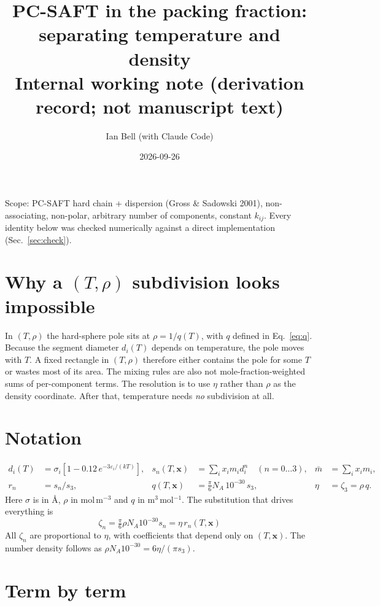 \documentclass[11pt]{article}
\author{Ian Bell (with Claude Code)}
\title{PC-SAFT in the packing fraction: separating temperature and density\\
\large Internal working note (derivation record; not manuscript text)}
\date{2026-09-26}
\newcommand{\mbar}{\bar m}
\begin{document}
\maketitle

\noindent Scope: PC-SAFT hard chain + dispersion (Gross \& Sadowski 2001), non-associating,
non-polar, arbitrary number of components, constant $k_{ij}$. Every identity below was checked
numerically against a direct implementation (Sec.~\ref{sec:check}).

\section{Why a $(T,\rho)$ subdivision looks impossible}

In $(T,\rho)$ the hard-sphere pole sits at $\rho = 1/q(T)$, with $q$ defined in
Eq.~\eqref{eq:q}. Because the segment diameter $d_i(T)$ depends on temperature, the pole moves
with $T$. A fixed rectangle in $(T,\rho)$ therefore either contains the pole for some $T$ or
wastes most of its area. The mixing rules are also not mole-fraction-weighted sums of
per-component terms. The resolution is to use $\eta$ rather than $\rho$ as the density
coordinate. After that, temperature needs \emph{no} subdivision at all.

\section{Notation}

\begin{align}
d_i(T) &= \sigma_i\left[1 - 0.12\,e^{-3\varepsilon_i/(kT)}\right], &
s_n(T,\mathbf x) &= \sum_i x_i m_i d_i^n \quad (n = 0\ldots3), &
\mbar &= \sum_i x_i m_i, \\
r_n &= s_n/s_3, &
q(T,\mathbf x) &= \tfrac{\pi}{6} N_A \, 10^{-30}\, s_3 , &
\eta &= \zeta_3 = \rho\, q. \label{eq:q}
\end{align}
Here $\sigma$ is in \AA, $\rho$ in mol\,m$^{-3}$ and $q$ in m$^3$\,mol$^{-1}$. The substitution
that drives everything is
\begin{equation}
\boxed{\;\zeta_n = \tfrac{\pi}{6}\rho N_A 10^{-30} s_n = \eta\, r_n(T,\mathbf x)\;}
\end{equation}
All $\zeta_n$ are proportional to $\eta$, with coefficients that depend only on
$(T,\mathbf x)$. The number density follows as $\rho N_A 10^{-30} = 6\eta/(\pi s_3)$.

\section{Term by term}
\end{document}
